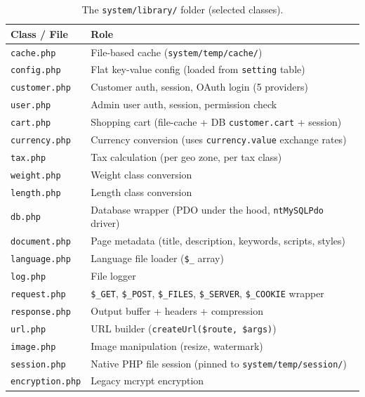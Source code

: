 \documentclass[11pt,a4paper]{article}
\begin{document}
\begin{table}[htbp]
\centering
\caption{The \texttt{system/library/} folder (selected classes).}\label{tab:library}
\footnotesize\sloppy
\begin{tabularx}{\columnwidth}{lX}
\toprule
\textbf{Class / File} & \textbf{Role} \\
\midrule
\texttt{cache.php}        & File-based cache (\texttt{system/temp/cache/}) \\
\texttt{config.php}       & Flat key-value config (loaded from \texttt{setting} table) \\
\texttt{customer.php}     & Customer auth, session, OAuth login (5 providers) \\
\texttt{user.php}         & Admin user auth, session, permission check \\
\texttt{cart.php}         & Shopping cart (file-cache + DB \texttt{customer.cart} + session) \\
\texttt{currency.php}     & Currency conversion (uses \texttt{currency.value} exchange rates) \\
\texttt{tax.php}          & Tax calculation (per geo zone, per tax class) \\
\texttt{weight.php}       & Weight class conversion \\
\texttt{length.php}       & Length class conversion \\
\texttt{db.php}           & Database wrapper (PDO under the hood, \texttt{ntMySQLPdo} driver) \\
\texttt{document.php}     & Page metadata (title, description, keywords, scripts, styles) \\
\texttt{language.php}     & Language file loader (\texttt{\$\_} array) \\
\texttt{log.php}          & File logger \\
\texttt{request.php}      & \texttt{\$\_GET}, \texttt{\$\_POST}, \texttt{\$\_FILES}, \texttt{\$\_SERVER}, \texttt{\$\_COOKIE} wrapper \\
\texttt{response.php}     & Output buffer + headers + compression \\
\texttt{url.php}          & URL builder (\texttt{createUrl(\$route, \$args)}) \\
\texttt{image.php}        & Image manipulation (resize, watermark) \\
\texttt{session.php}      & Native PHP file session (pinned to \texttt{system/temp/session/}) \\
\texttt{encryption.php}   & Legacy mcrypt encryption \\

\end{tabularx}
\end{table}
\end{document}
